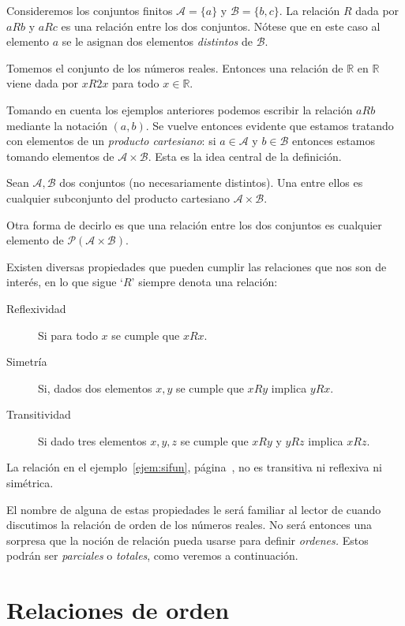 \begin{ejem}\label{ejem:nofun}
	Consideremos los conjuntos finitos $\mathcal{A}=\{ a \}$ y $\mathcal{B}=\{ b,c \}$. La relación $R$ dada por
	$aRb$ y $aRc$ es una relación entre los dos conjuntos. Nótese que en este caso al elemento $a$ se le asignan
	dos elementos \emph{distintos} de $\mathcal{B}$.
\end{ejem}

\begin{ejem}\label{ejem:sifun}
	Tomemos el conjunto de los números reales. Entonces una relación de $\mathbb{R}$ en $\mathbb{R}$
	viene dada por $xR2x$ para todo $x\in\mathbb{R}$.
\end{ejem}

Tomando en cuenta los ejemplos anteriores podemos escribir la relación $aRb$ mediante la notación $(a,b)$.
Se vuelve entonces evidente que estamos tratando con elementos de un \emph{producto cartesiano}: si
$a\in\mathcal{A}$ y $b\in\mathcal{B}$ entonces estamos tomando elementos de $\mathcal{A}\times\mathcal{B}$.
Esta es la idea central de la definición.

\begin{defi}
	Sean $\mathcal{A},\mathcal{B}$ dos conjuntos (no necesariamente distintos).
	Una  entre ellos es cualquier subconjunto del producto cartesiano
	$\mathcal{A}\times\mathcal{B}$.
\end{defi}

Otra forma de decirlo es que una relación entre los dos conjuntos es cualquier elemento de $\mathcal{P}(\mathcal{A}\times\mathcal{B})$.

Existen diversas propiedades que pueden cumplir las relaciones que nos son de interés, en lo que sigue `$R$' siempre denota una relación:
\begin{description}
	\item[Reflexividad] Si para todo $x$ se cumple que $xRx$.
	\item[Simetría] Si, dados dos elementos $x,y$ se cumple que
		$xRy$ implica $yRx$.
	\item[Transitividad] Si dado tres elementos $x,y,z$ se cumple que
		$xRy$ y $yRz$ implica $xRz$.
\end{description}

\begin{ejem}
	La relación en el ejemplo~\ref{ejem:sifun}, página~\pageref{ejem:sifun}, no es transitiva ni reflexiva ni simétrica.	
\end{ejem}

El nombre de alguna de estas propiedades le será familiar al lector de cuando discutimos la relación de orden de los números reales.
No será entonces una sorpresa que la noción de relación pueda usarse para definir \emph{ordenes.} Estos podrán ser \emph{parciales} o
\emph{totales}, como veremos a continuación.

\section{Relaciones de orden}%
\label{sec:Relaciones de orden}

